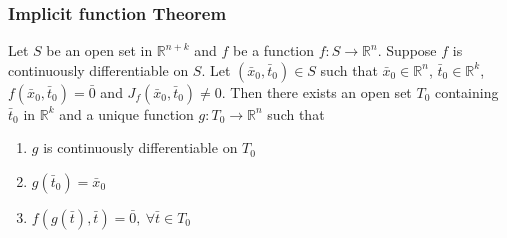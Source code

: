 \subsubsection{Implicit function Theorem}
\begin{theorem}
	Let $S$ be an open set in $\mathbb{R}^{n+k}$ and
	$f$ be a function $f : S \to \mathbb{R}^n$.
	Suppose $f$ is continuously differentiable on $S$.
	Let $(\bar{x}_0,\bar{t}_0) \in S$
	such that $\bar{x}_0 \in \mathbb{R}^n$, $\bar{t}_0 \in \mathbb{R}^k$, $f(\bar{x}_0,\bar{t}_0) = \bar{0}$ and $J_f(\bar{x}_0,\bar{t}_0) \ne 0$.
	Then there exists an open set $T_0$ containing $\bar{t}_0$ in $\mathbb{R}^k$ and
	a unique function $g : T_0 \to \mathbb{R}^n$ such that
\begin{enumerate}
	\item $g$ is continuously differentiable on $T_0$
	\item $g(\bar{t}_0) = \bar{x}_0$
	\item $f(g(\bar{t}),\bar{t}) = \bar{0},\ \forall \bar{t} \in T_0$
\end{enumerate}
\end{theorem}
